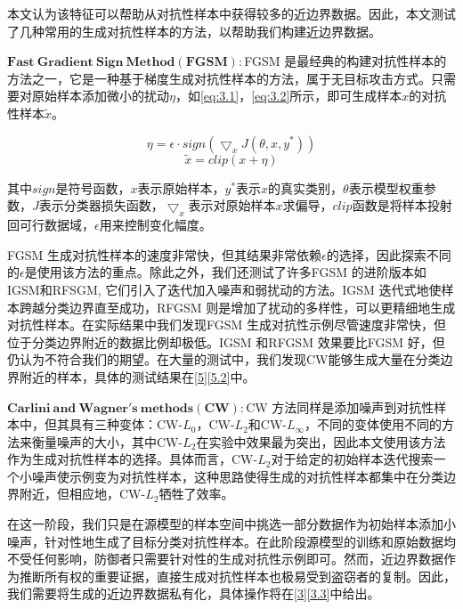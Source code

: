 本文认为该特征可以帮助从对抗性样本中获得较多的近边界数据。因此，本文测试了几种常用的生成对抗性样本的方法，以帮助我们构建近边界数据。

\noindent$\bm{Fast \ Gradient \ Sign \ Method(FGSM):}$FGSM \cite{goodfellow2014explaining}是最经典的构建对抗性样本的方法之一，它是一种基于梯度生成对抗性样本的方法，属于无目标攻击方式。只需要对原始样本添加微小的扰动$\eta$，如\ref{eq:3.1}，\ref{eq:3.2}所示，即可生成样本$x$的对抗性样本$\tilde{x}$。

\begin{equation}
	\label{eq:3.1}
	\eta = \epsilon \cdot sign(\bigtriangledown_xJ(\theta,x,y^*))
\end{equation}
\begin{equation}
	\label{eq:3.2}
	\tilde{x} = clip(x + \eta)
\end{equation}

\noindent 其中$sign$是符号函数，$x$表示原始样本，$y^*$表示$x$的真实类别，$\theta$表示模型权重参数，$J$表示分类器损失函数，$\bigtriangledown_x$表示对原始样本$x$求偏导，$clip$函数是将样本投射回可行数据域，$\epsilon$用来控制变化幅度。

FGSM 生成对抗性样本的速度非常快，但其结果非常依赖$\epsilon$的选择，因此探索不同的$\epsilon$是使用该方法的重点。除此之外，我们还测试了许多FGSM 的进阶版本如IGSM和RFSGM, 它们引入了迭代加入噪声和弱扰动的方法。IGSM 迭代式地使样本跨越分类边界直至成功，RFGSM 则是增加了扰动的多样性，可以更精细地生成对抗性样本。在实际结果中我们发现FGSM 生成对抗性示例尽管速度非常快，但位于分类边界附近的数据比例却极低。IGSM 和RFGSM 效果要比FGSM 好，但仍认为不符合我们的期望。在大量的测试中，我们发现CW能够生成大量在分类边界附近的样本，具体的测试结果在\ref{5}\ref{5.2}中。

\noindent$\bm{Carlini \ and \ Wagner's \ methods(CW):}$CW \cite{carlini2017towards}方法同样是添加噪声到对抗性样本中，但其具有三种变体：CW-$L_0$，CW-$L_2$和CW-$L_{\infty}$，不同的变体使用不同的方法来衡量噪声的大小，其中CW-$L_2$在实验中效果最为突出，因此本文使用该方法作为生成对抗性样本的选择。具体而言，CW-$L_2$对于给定的初始样本迭代搜索一个小噪声使示例变为对抗性样本，这种思路使得生成的对抗性样本都集中在分类边界附近，但相应地，CW-$L_2$牺牲了效率。

在这一阶段，我们只是在源模型的样本空间中挑选一部分数据作为初始样本添加小噪声，针对性地生成了目标分类对抗性样本。在此阶段源模型的训练和原始数据均不受任何影响，防御者只需要针对性的生成对抗性示例即可。然而，近边界数据作为推断所有权的重要证据，直接生成对抗性样本也极易受到盗窃者的复制。因此，我们需要将生成的近边界数据私有化，具体操作将在\ref{3}\ref{3.3}中给出。

